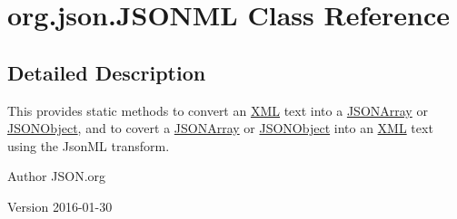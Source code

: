 \hypertarget{classorg_1_1json_1_1JSONML}{\section{org.\-json.\-J\-S\-O\-N\-M\-L Class Reference}
\label{classorg_1_1json_1_1JSONML}
}


\subsection{Detailed Description}
This provides static methods to convert an \hyperlink{classorg_1_1json_1_1XML}{X\-M\-L} text into a \hyperlink{classorg_1_1json_1_1JSONArray}{J\-S\-O\-N\-Array} or \hyperlink{classorg_1_1json_1_1JSONObject}{J\-S\-O\-N\-Object}, and to covert a \hyperlink{classorg_1_1json_1_1JSONArray}{J\-S\-O\-N\-Array} or \hyperlink{classorg_1_1json_1_1JSONObject}{J\-S\-O\-N\-Object} into an \hyperlink{classorg_1_1json_1_1XML}{X\-M\-L} text using the Json\-M\-L transform.

\begin{DoxyAuthor}{Author}
J\-S\-O\-N.\-org 
\end{DoxyAuthor}
\begin{DoxyVersion}{Version}
2016-\/01-\/30 
\end{DoxyVersion}
